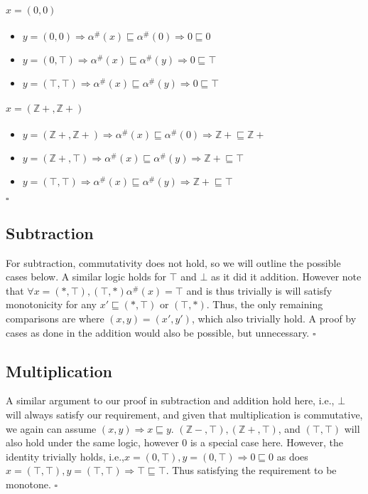 \documentclass{article}
\begin{document}
\paragraph{$x = (0,0)$}
\begin{itemize}
\item $y = (0,0) \Rightarrow \alpha^{\#}(x) \sqsubseteq \alpha^{\#}(0) \Rightarrow 0 \sqsubseteq 0$
\item $y = (0,\top) \Rightarrow \alpha^{\#}(x) \sqsubseteq \alpha^{\#}(y) \Rightarrow 0 \sqsubseteq \top$
\item $y = (\top,\top) \Rightarrow \alpha^{\#}(x) \sqsubseteq \alpha^{\#}(y) \Rightarrow 0 \sqsubseteq \top$
\end{itemize}
\paragraph{$x = (\mathbb{Z+},\mathbb{Z+})$}
\begin{itemize}
\item $y = (\mathbb{Z+},\mathbb{Z+}) \Rightarrow \alpha^{\#}(x) \sqsubseteq \alpha^{\#}(0) \Rightarrow \mathbb{Z+} \sqsubseteq \mathbb{Z+}$
\item $y = (\mathbb{Z+},\top) \Rightarrow \alpha^{\#}(x) \sqsubseteq \alpha^{\#}(y) \Rightarrow \mathbb{Z+} \sqsubseteq \top$
\item $y = (\top,\top) \Rightarrow \alpha^{\#}(x) \sqsubseteq \alpha^{\#}(y) \Rightarrow \mathbb{Z+} \sqsubseteq \top$
\end{itemize} $\square$

\subsection{Subtraction}
For subtraction, commutativity does not hold, so we will outline the possible cases below.
A similar logic holds for $\top$ and $\bot$ as it did it addition.
However note that $\forall x = (*,\top), (\top,*)  \alpha^{\#}(x) = \top$ and is thus trivially is will satisfy monotonicity for any $x' \sqsubseteq (*,\top)$ or $(\top,*)$.
Thus, the only remaining comparisons are where $(x,y) = (x',y')$, which also trivially hold.
A proof by cases as done in the addition would also be possible, but unnecessary. $\square$

\subsection{Multiplication}
A similar argument to our proof in subtraction and addition hold here, i.e., $\bot$ will always satisfy our requirement, and given that multiplication is commutative, we again can assume $(x,y) \Rightarrow x \sqsubseteq y$.
$(\mathbb{Z-},\top), (\mathbb{Z+},\top)$, and $(\top,\top)$ will also hold under the same logic, however 0 is a special case here.
However, the identity trivially holds, i.e.,$x = (0,\top), y = (0,\top) \Rightarrow 0 \sqsubseteq 0$ as does $x = (\top,\top), y = (\top,\top) \Rightarrow \top \sqsubseteq \top$.
Thus satisfying the requirement to be monotone. $\square$
\end{document}
